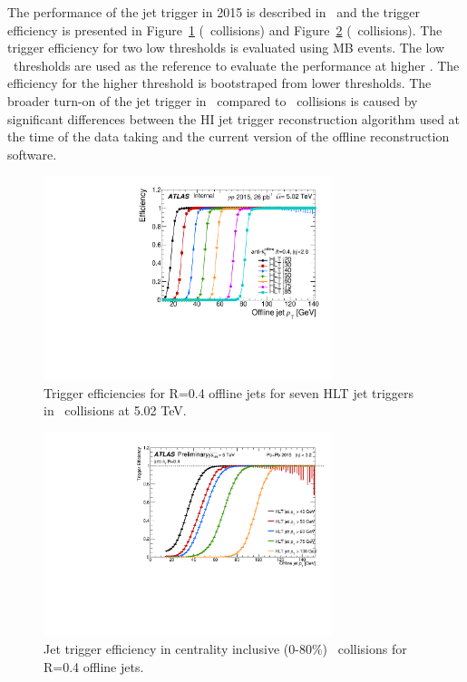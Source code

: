   The performance of the jet trigger in 2015 is described in~\cite{HITMF} and the trigger efficiency is presented in Figure~\ref{Fig:Trigger_pp5} (\pp\ collisions) and Figure~\ref{fig:Trigger_PbPb} (\pbpb\ collisions). The trigger efficiency for two low thresholds is evaluated using MB events. The low \pT\ thresholds are used as the reference to evaluate the performance at higher \pT. The efficiency for the higher threshold is bootstraped from lower thresholds. The broader turn-on of the jet trigger in \pbpb\ compared to \pp\ collisions is caused by significant differences between the HI jet trigger reconstruction algorithm used at the time of the data taking and the current version of the offline reconstruction software.

  \begin{figure}[h]
 \centerline{
 \includegraphics[width=0.75\textwidth]{figures/main/general/Eff_pp_5TeV_central.pdf}
}
 \caption{Trigger efficiencies for R=0.4 offline jets for seven HLT jet triggers in \pp\ collisions at 5.02 TeV.}
 \label{Fig:Trigger_pp5}
 \end{figure}


 \begin{figure}[h]
    \centerline{
       \includegraphics[width=0.75\textwidth]{figures/main/general/trigger_eff_PbPb_CentInclusive.pdf}
    }
    \caption{Jet trigger efficiency in centrality inclusive (0-80\%) \pbpb\ collisions for R=0.4 offline
    jets.}
    \label{fig:Trigger_PbPb}
 \end{figure}

